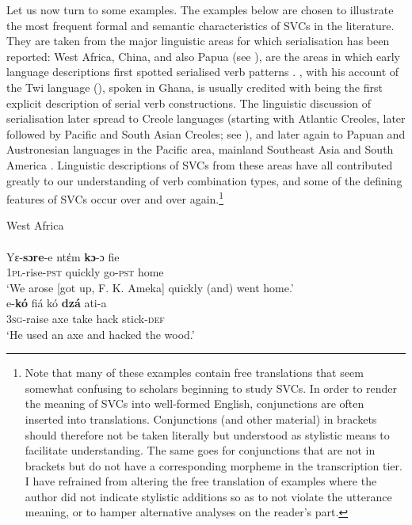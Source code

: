 Let us now turn to some examples. The examples below are chosen to illustrate the most frequent formal and semantic characteristics of SVCs in the literature. They are taken from the major linguistic areas for which serialisation has been reported: West Africa, China, and also Papua (see \citealt[2]{senft2008intro}), are the areas in which early language descriptions first spotted serialised verb patterns \citep{sebba1987syntax, Matthews2006}. \citet{christaller1875}, with his account of the Twi language (), spoken in Ghana, is usually credited with being the first explicit description of serial verb constructions. The linguistic discussion of serialisation later spread to Creole languages (starting with Atlantic Creoles, later followed by Pacific and South Asian Creoles; see \citealt{nordhoff2012}), and later again to Papuan and Austronesian languages in the Pacific area, mainland Southeast Asia and South America \citep{senft2008event}. Linguistic descriptions of SVCs from these areas have all contributed greatly to our understanding of verb combination types, and some of the defining features of SVCs occur over and over again.\footnote{Note that many of these examples contain free translations that seem somewhat confusing to scholars beginning to study SVCs. In order to render the meaning of SVCs into well-formed English, conjunctions are often inserted into translations. Conjunctions (and other material) in brackets should therefore not be taken literally but understood as stylistic means to facilitate understanding. The same goes for conjunctions that are not in brackets but do not have a corresponding morpheme in the transcription tier. I have refrained from altering the free translation of examples where the author did not indicate stylistic additions so as to not violate the utterance meaning, or to hamper alternative analyses on the reader's part.}

\ea \label{Twi0001} 
West Africa\\
\ea \label{Twi01}
\\
\gll Yε-\textbf{sɔre}-e ntέm \textbf{kɔ}-ɔ  fie\\
\textsc{1}\textsc{pl}-rise-\textsc{pst} quickly go-\textsc{pst} home\\
\glt ‘We arose [got up, F. K. Ameka] quickly (and) went home.’
\ex \label{Ewe01}
\\
\gll e-\textbf{kó} fiá kó \textbf{dzá} ati-a \\
\textsc{3}\textsc{sg}-raise axe take hack stick-\textsc{def}\\
\glt ‘He used an axe and hacked the wood.’
\z
\z

